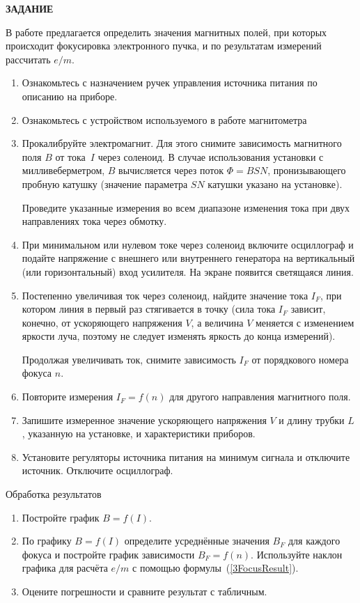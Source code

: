 {\Large \bf ЗАДАНИЕ}

В работе предлагается определить значения магнитных полей, при которых происходит фокусировка электронного пучка, и по результатам измерений рассчитать $e/m$.

\begin{enumerate}
\item{Ознакомьтесь с назначением ручек управления источника питания по описанию на приборе.}
\item{Ознакомьтесь с устройством используемого в работе магнитометра}
\item{ Прокалибруйте электромагнит. Для этого снимите зависимость магнитного поля $B$ от тока~$I$ через соленоид.  В случае использования установки с милливеберметром, $B$ вычисляется через поток $\Phi=BSN$, пронизывающего пробную катушку (значение параметра $SN$ катушки указано на установке).

Проведите указанные измерения во всем диапазоне изменения тока при двух направлениях тока через обмотку.}

\item{ При минимальном или нулевом токе через соленоид включите осциллограф  и подайте напряжение с внешнего или внутреннего генератора на вертикальный (или горизонтальный) вход усилителя. На экране появится светящаяся линия.}

\item{ Постепенно увеличивая ток через соленоид, найдите значение тока $I_F$, при котором линия в первый раз стягивается в точку (сила тока $I_F$ зависит, конечно, от ускоряющего напряжения $V$, а величина $V$ меняется с изменением яркости луча, поэтому не следует изменять яркость до конца измерений).

     Продолжая увеличивать ток, снимите зависимость $I_F$ от порядкового номера фокуса $n$.}
\item{ Повторите измерения $I_F=f(n)$ для другого направления магнитного поля.}
\item{ Запишите измеренное значение ускоряющего напряжения $V$ и длину трубки $L$, указанную на установке, и характеристики приборов.}
\item{Установите регуляторы источника питания на минимум сигнала и отключите источник. Отключите осциллограф.}
\end{enumerate}

{\rm Обработка результатов}

\begin{enumerate}
\item{Постройте график $B=f(I)$.}
\item{По графику $B=f(I)$ определите усреднённые значения $B_F$ для каждого фокуса и постройте график зависимости $B_F=f(n)$. Используйте наклон графика для расчёта $e/m$ с помощью формулы~(\ref{3FocusResult}).}
\item{Оцените погрешности и сравните результат с табличным.}

\end{enumerate}



